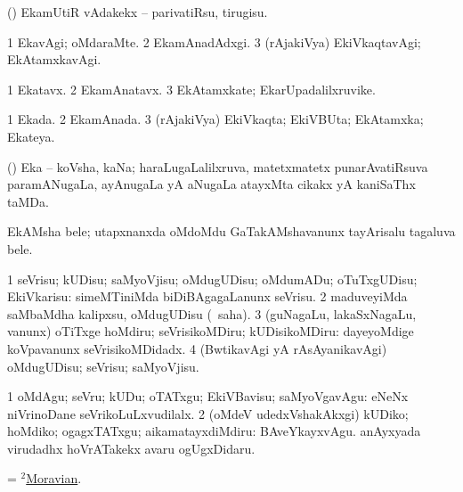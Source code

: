 \bentry
{} 
\gl{\sakirx}
\expl{}
\bmng
(\kerxY) EkamUtiR vAdakekx -- parivatiRsu, tirugisu. 
\emng
\eentry

\bentry
{} 
\gl{\kirxvi}
\bmng
\bnum
\num{1} EkavAgi; oMdaraMte. 
\num{2} EkamAnadAdxgi. 
\num{3} (rAjakiVya) EkiVkaqtavAgi; EkAtamxkavAgi. 
\enum
\emng
\eentry

\bentry
{} 
\gl{\nA}
\expl{}
\bmng
\bnum
\num{1} Ekatavx. 
\num{2} EkamAnatavx. 
\num{3} EkAtamxkate; EkarUpadalilxruvike. 
\enum
\emng
\eentry

\bentry
{} 
\gl{\gu}
\bmng
\bnum
\num{1} Ekada. 
\num{2} EkamAnada. 
\num{3} (rAjakiVya) EkiVkaqta; EkiVBUta; EkAtamxka; Ekateya. 
\enum
\emng
\eentry

\bentry
{}
\gl{\nA}
\expl{}
\bmng
(\saPxvi) Eka -- koVsha, kaNa; haraLugaLalilxruva, matetxmatetx punarAvatiRsuva paramANugaLa, ayAnugaLa yA aNugaLa atayxMta cikakx yA kaniSaThx taMDa. 
\emng
\eentry

\bentry
{}
\gl{\nA}
\expl{}
\bmng
EkAMsha bele; utapxnanxda oMdoMdu GaTakAMshavanunx tayArisalu tagaluva bele. 
\emng
\eentry

\bentry
{} 
\gl{\sakirx}
\expl{}
\bmng
\bnum
\num{1} seVrisu; kUDisu; saMyoVjisu; oMdugUDisu; oMdumADu; oTuTxgUDisu; EkiVkarisu:  simeMTiniMda biDiBAgagaLanunx seVrisu. 
\num{2} maduveyiMda saMbaMdha kalipxsu, oMdugUDisu (\akirx\ saha). 
\num{3} (guNagaLu, lakaSxNagaLu, \mo vanunx) oTiTxge hoMdiru; seVrisikoMDiru; kUDisikoMDiru:  dayeyoMdige koVpavanunx seVrisikoMDidadx. 
\num{4} (BwtikavAgi yA rAsAyanikavAgi) oMdugUDisu; seVrisu; saMyoVjisu. 
\enum
\emng

\noindent
\gl{\akirx}
\expl{}
\bmng
\bnum
\num{1} oMdAgu; seVru; kUDu; oTATxgu; EkiVBavisu; saMyoVgavAgu:  eNeNx niVrinoDane seVrikoLuLxvudilalx. 
\num{2} (oMdeV udedxVshakAkxgi) kUDiko; hoMdiko; ogagxTATxgu; aikamatayxdiMdiru:  BAveYkayxvAgu.  anAyxyada virudadhx hoVrATakekx avaru ogUgxDidaru. 
\enum
\emng
\eentry

\bentry
{}
\gl{\nA}
\expl{}
\bmng
= \hyperref{kandict_m.pdf}{M}{Moravian(2)}{$^2$Moravian}. 
\emng
\eentry

